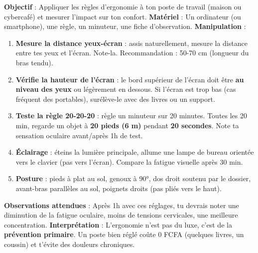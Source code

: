 \documentclass[11pt]{article}
\begin{document}
\begin{experience}
\textbf{Objectif} : Appliquer les règles d'ergonomie à ton poste de travail (maison ou cybercafé) et mesurer l'impact sur ton confort.
\textbf{Matériel} : Un ordinateur (ou smartphone), une règle, un minuteur, une fiche d'observation.
\textbf{Manipulation} :
\begin{enumerate}
    \item \textbf{Mesure la distance yeux-écran} : assis naturellement, mesure la distance entre tes yeux et l'écran. Note-la. Recommandation : 50-70 cm (longueur du bras tendu).
    \item \textbf{Vérifie la hauteur de l'écran} : le bord supérieur de l'écran doit être \textbf{au niveau des yeux} ou légèrement en dessous. Si l'écran est trop bas (cas fréquent des portables), surélève-le avec des livres ou un support.
    \item \textbf{Teste la règle 20-20-20} : règle un minuteur sur 20 minutes. Toutes les 20 min, regarde un objet à \textbf{20 pieds (6 m)} pendant \textbf{20 secondes}. Note ta sensation oculaire avant/après 1h de test.
    \item \textbf{Éclairage} : éteins la lumière principale, allume une lampe de bureau orientée vers le clavier (pas vers l'écran). Compare la fatigue visuelle après 30 min.
    \item \textbf{Posture} : pieds à plat au sol, genoux à 90°, dos droit soutenu par le dossier, avant-bras parallèles au sol, poignets droits (pas pliés vers le haut).
\end{enumerate}
\textbf{Observations attendues} : Après 1h avec ces réglages, tu devrais noter une diminution de la fatigue oculaire, moins de tensions cervicales, une meilleure concentration.
\textbf{Interprétation} : L'ergonomie n'est pas du luxe, c'est de la \textbf{prévention primaire}. Un poste bien réglé coûte 0 FCFA (quelques livres, un coussin) et t'évite des douleurs chroniques.
\end{experience}
\end{document}
